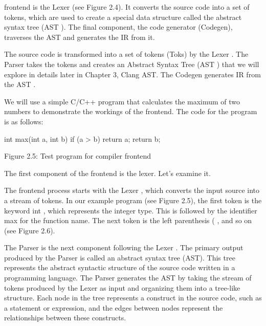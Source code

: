 frontend is the Lexer (see Figure 2.4). It converts the source code into a set of tokens, which are used to create a special data structure called the abstract syntax tree (AST ). The final component, the code generator (Codegen), traverses the AST and generates the IR from it.


The source code is transformed into a set of tokens (Toks) by the Lexer . The Parser takes the tokens and creates an Abstract Syntax Tree (AST ) that we will explore in details later in Chapter 3, Clang AST. The Codegen generates IR from the AST .

We will use a simple C/C++ program that calculates the maximum of two numbers to demonstrate the workings of the frontend. The code for the program is as follows:

\begin{cpp}
int max(int a, int b) {
  if (a > b)
    return a;
  return b;
}
\end{cpp}

\begin{center}
Figure 2.5: Test program for compiler frontend
\end{center}

The first component of the frontend is the lexer. Let’s examine it.


The frontend process starts with the Lexer , which converts the input source into a stream of tokens. In our example program (see Figure 2.5), the first token is the keyword int , which represents the integer type. This is followed by the identifier max for the function name. The next token is the left parenthesis ( , and so on (see Figure 2.6).



The Parser is the next component following the Lexer . The primary output produced by the Parser is called an abstract syntax tree (AST). This tree represents the abstract syntactic structure of the source code written in a programming language. The Parser generates the AST by taking the stream of tokens produced by the Lexer as input and organizing them into a tree-like structure. Each node in the tree represents a construct in the source code, such as a statement or expression, and the edges between nodes represent the relationships between these constructs.

